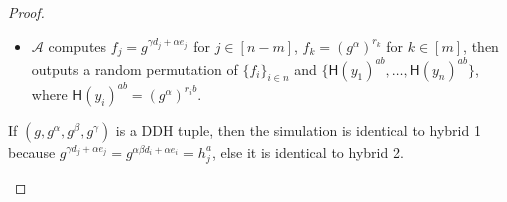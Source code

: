 \begin{proof}
\begin{trivlist}
\begin{itemize}
    \item $\mathcal{A}$ computes $f_j = g^{\gamma d_j + \alpha e_j}$ for $j \in [n-m]$, 
        $f_k = (g^\alpha)^{r_k}$ for $k \in [m]$, 
        then outputs a random permutation of $\{f_i\}_{i \in n}$ 
        and $\{\mathsf{H}(y_1)^{ab}, \dots, \mathsf{H}(y_n)^{ab}\}$, where $\mathsf{H}(y_i)^{ab} = (g^\alpha)^{r_ib}$.      
\end{itemize}

If $(g, g^\alpha, g^\beta, g^\gamma)$ is a DDH tuple, 
then the simulation is identical to hybrid 1 because $g^{\gamma d_j + \alpha e_j} = g^{\alpha \beta d_i + \alpha e_i} = h_j^a$, 
else it is identical to hybrid 2. 
\end{trivlist}


\end{proof}

